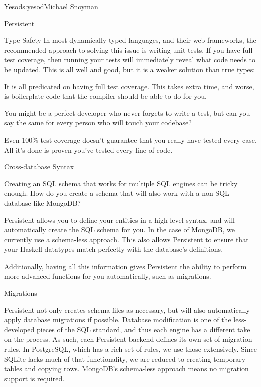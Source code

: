 \begin{aosachapter}{Yesod}{s:yesod}{Michael Snoyman}
\begin{aosasect1}{Persistent}
\begin{aosasect2}{Type Safety}
In most dynamically-typed languages, and their web frameworks, the
recommended approach to solving this issue is writing unit tests. If
you have full test coverage, then running your tests will immediately
reveal what code needs to be updated. This is all well and good, but
it is a weaker solution than true types:

\begin{aosaitemize}

\item It is all predicated on having full test coverage. This takes
  extra time, and worse, is boilerplate code that the compiler should
  be able to do for you.

\item You might be a perfect developer who never forgets to write a
  test, but can you say the same for every person who will touch your
  codebase?

\item Even 100\% test coverage doesn't guarantee that you really have
  tested every case. All it's done is proven you've tested every line
  of code.

\end{aosaitemize}

\end{aosasect2}

\begin{aosasect2}{Cross-database Syntax}

Creating an SQL schema that works for multiple SQL engines can be
tricky enough. How do you create a schema that will also work with a
non-SQL database like MongoDB?

Persistent allows you to define your entities in a high-level syntax,
and will automatically create the SQL schema for you. In the case of
MongoDB, we currently use a schema-less approach. This also allows
Persistent to ensure that your Haskell datatypes match perfectly with
the database's definitions.

Additionally, having all this information gives Persistent the ability
to perform more advanced functions for you automatically, such as
migrations.

\end{aosasect2}

\begin{aosasect2}{Migrations}

Persistent not only creates schema files as necessary, but will also
automatically apply database migrations if possible. Database
modification is one of the less-developed pieces of the SQL standard,
and thus each engine has a different take on the process. As such,
each Persistent backend defines its own set of migration rules. In
PostgreSQL, which has a rich set of  rules, we use
those extensively. Since SQLite lacks much of that functionality, we
are reduced to creating temporary tables and copying rows. MongoDB's
schema-less approach means no migration support is required.


\end{aosasect2}
\end{aosasect1}
\end{aosachapter}
